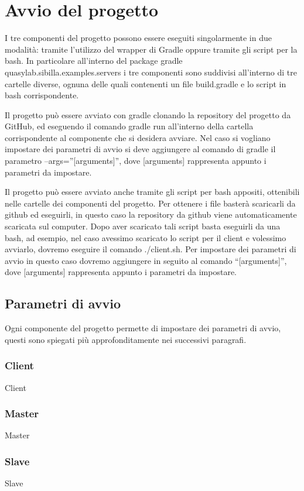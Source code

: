 

\section{Avvio del progetto}
I tre componenti del progetto possono essere eseguiti singolarmente in due modalità: tramite l’utilizzo del wrapper di Gradle oppure tramite gli script per la bash. In particolare all’interno del package gradle quasylab.sibilla.examples.servers i tre componenti sono suddivisi all’interno di tre cartelle diverse, ognuna delle quali contenenti un file build.gradle e lo script in bash corrispondente.

Il progetto può essere avviato con gradle clonando la repository del progetto da GitHub, ed eseguendo il comando gradle run all’interno della cartella corrispondente al componente che si desidera avviare. Nel caso si vogliano impostare dei parametri di avvio si deve aggiungere al comando di gradle il parametro --args=”[arguments]”, dove [arguments] rappresenta appunto i parametri da impostare.

Il progetto può essere avviato anche tramite gli script per bash appositi, ottenibili nelle cartelle dei componenti del progetto. Per ottenere i file basterà scaricarli da github ed eseguirli, in questo caso la repository da github viene automaticamente scaricata sul computer. Dopo aver scaricato tali script basta eseguirli da una bash, ad esempio, nel caso avessimo scaricato lo script per il client e volessimo avviarlo, dovremo eseguire il comando ./client.sh. Per impostare dei parametri di avvio in questo caso dovremo aggiungere in seguito al comando “[arguments]”, dove [arguments] rappresenta appunto i parametri da impostare.

\subsection{Parametri di avvio}

Ogni componente del progetto permette di impostare dei parametri di avvio, questi sono spiegati più approfonditamente nei successivi paragrafi.

\subsubsection{Client}

Client
\subsubsection{Master}
Master
\subsubsection{Slave}
Slave